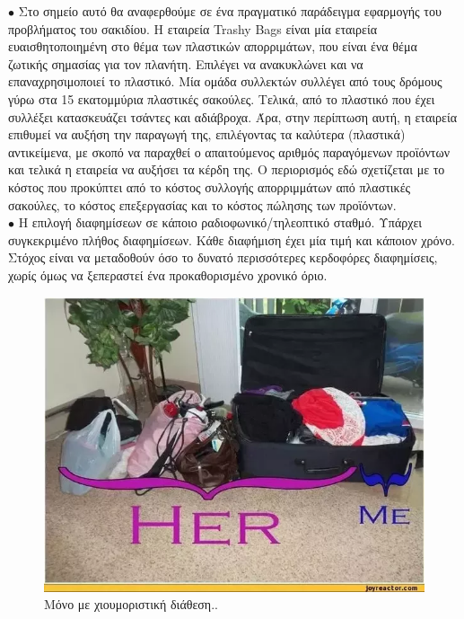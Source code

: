 \documentclass[12pt]{article}
\begin{document}
\(\bullet\) Στο σημείο αυτό θα αναφερθούμε σε ένα πραγματικό παράδειγμα εφαρμογής του προβλήματος του σακιδίου. Η εταιρεία Trashy Bags είναι μία εταιρεία ευαισθητοποιημένη στο θέμα των πλαστικών απορριμάτων, που είναι ένα θέμα ζωτικής σημασίας για τον πλανήτη. Επιλέγει να ανακυκλώνει και να επαναχρησιμοποιεί το πλαστικό. Μία ομάδα συλλεκτών συλλέγει από τους δρόμους γύρω στα 15 εκατομμύρια πλαστικές σακούλες. Τελικά, από το πλαστικό που έχει συλλέξει κατασκευάζει τσάντες και αδιάβροχα. Άρα, στην περίπτωση αυτή, η εταιρεία επιθυμεί να αυξήση την παραγωγή της, επιλέγοντας τα καλύτερα (πλαστικά) αντικείμενα, με σκοπό να παραχθεί ο απαιτούμενος  αριθμός  παραγόμενων προϊόντων και τελικά η εταιρεία να αυξήσει τα κέρδη της. Ο περιορισμός εδώ σχετίζεται με το κόστος που προκύπτει από το κόστος συλλογής απορριμμάτων από πλαστικές σακούλες,  το  κόστος  επεξεργασίας  και  το  κόστος  πώλησης  των προϊόντων. \\

\(\bullet\) Η επιλογή διαφημίσεων σε κάποιο ραδιοφωνικό/τηλεοπτικό σταθμό. Υπάρχει συγκεκριμένο πλήθος διαφημίσεων. Κάθε διαφήμιση έχει μία τιμή και κάποιον χρόνο. Στόχος είναι να μεταδοθούν όσο το δυνατό περισσότερες κερδοφόρες διαφημίσεις, χωρίς όμως να ξεπεραστεί ένα προκαθορισμένο χρονικό όριο. \\

\begin{figure}[!]
	\centering
	\includegraphics[scale=0.65]{./figures/knapsack-example.png}
	\caption{Μόνο με χιουμοριστική διάθεση..}
\end{figure}
\end{document}
